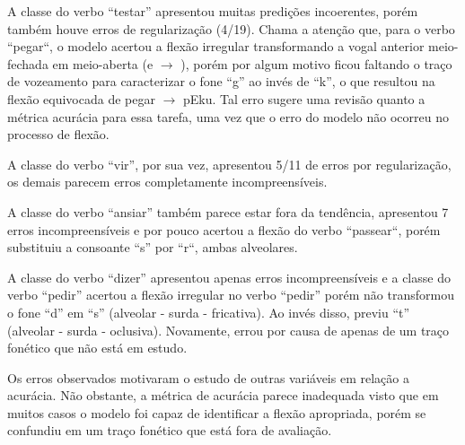 A classe do verbo “testar” apresentou muitas predições incoerentes, porém também houve erros de regularização (4/19). Chama a atenção que, para o verbo “pegar“, o modelo acertou a flexão irregular transformando a vogal anterior meio-fechada em meio-aberta (e $\rightarrow$ \textepsilon), porém por algum motivo ficou faltando o traço de vozeamento para caracterizar o fone “g” ao invés de “k”, o que resultou na flexão equivocada de pegar $\rightarrow$ pEku.
Tal erro sugere uma revisão quanto a métrica acurácia para essa tarefa, uma vez que o erro do modelo não ocorreu no processo de flexão.

A classe do verbo “vir”, por sua vez, apresentou 5/11 de erros por regularização, os demais parecem erros completamente incompreensíveis.

A classe do verbo “ansiar” também parece estar fora da tendência, apresentou 7 erros incompreensíveis e por pouco acertou a flexão do verbo “passear“, porém substituiu a consoante “s” por “r“, ambas alveolares. 

A classe do verbo “dizer” apresentou apenas erros incompreensíveis e a classe do verbo “pedir” acertou a flexão irregular no verbo “pedir” porém não transformou o fone “d” em “s” (alveolar - surda - fricativa). Ao invés disso, previu “t” (alveolar - surda - oclusiva). Novamente, errou por causa de apenas de um traço fonético que não está em estudo.

Os erros observados motivaram o estudo de outras variáveis em relação a acurácia. Não obstante, a métrica de acurácia parece inadequada visto que em muitos casos o modelo foi capaz de identificar a flexão apropriada, porém se confundiu em um traço fonético que está fora de avaliação.





